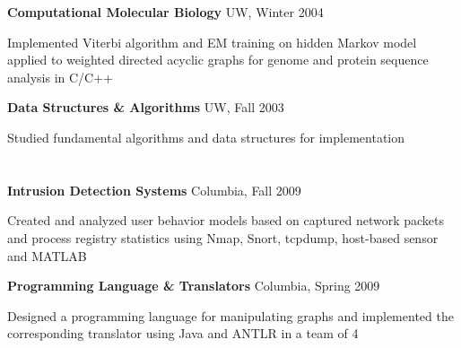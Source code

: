 \documentclass[margin,line]{resume}
\begin{document}
\begin{resume}
    \textbf{Computational Molecular Biology} \hfill UW, Winter 2004  \vspace{-3mm}\\\vspace{-1mm}%
      \begin{list2}
      \item Implemented Viterbi algorithm and EM training on hidden Markov model applied to weighted directed acyclic graphs for genome and protein sequence analysis in C/C++ 
      \end{list2}

      

    \textbf{Data Structures \& Algorithms} \hfill UW, Fall 2003 \vspace{-3mm}\\\vspace{-1mm}%
      \begin{list2}
      \item Studied fundamental algorithms and data structures for implementation 
      \end{list2}

      

    \section{\mysidestyle [System]} 

    \textbf{Intrusion Detection Systems} \hfill Columbia, Fall 2009  \vspace{-3mm}\\\vspace{-1mm}%
      \begin{list2}
      \item Created and analyzed user behavior models based on captured network packets and process registry statistics using Nmap, Snort, tcpdump, host-based sensor and MATLAB 
      \end{list2}
      

    \textbf{Programming Language \& Translators} \hfill Columbia, Spring 2009  \vspace{-3mm}\\\vspace{-1mm}%
      \begin{list2}
      \item Designed a programming language for manipulating graphs and implemented the corresponding translator using Java and ANTLR in a team of 4 
      \end{list2}


\end{resume}
\end{document}
